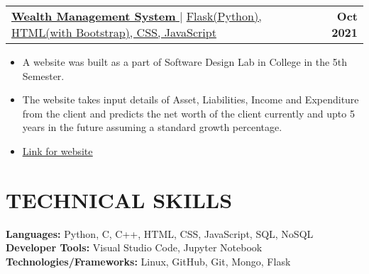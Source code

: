 \documentclass[letterpaper,11pt]{article}
\makeatletter
\newcommand{\resumeItem}[1]{
  \item\small{
    {#1 \vspace{-2pt}}
  }
}
\newcommand{\resumeSubheading}[4]{
  \vspace{-2pt}\item
    \begin{tabular*}{1.0\textwidth}[t]{l@{\extracolsep{\fill}}r}
      \textbf{\large#1} & \textbf{\small #2} \\
      \textit{\large#3} & \textit{\small #4} \\
      
    \end{tabular*}\vspace{-7pt}
}
\newcommand{\resumeProjectHeading}[2]{
    \item
    \begin{tabular*}{1.001\textwidth}{l@{\extracolsep{\fill}}r}
      \small#1 & \textbf{\small #2}\\
    \end{tabular*}\vspace{-7pt}
}
\newcommand{\resumeSubHeadingListStart}{\begin{itemize}[leftmargin=0.0in, label={}]}
\newcommand{\resumeSubHeadingListEnd}{\end{itemize}}
\newcommand{\resumeItemListStart}{\begin{itemize}}
\newcommand{\resumeItemListEnd}{\end{itemize}\vspace{-5pt}}
\makeatother
\begin{document}
      \resumeProjectHeading
          {\href{https://github.com/Sh0702/worth-it}{\textbf{\large{\underline{Wealth Management System}}} \href{Project Link}{\raisebox{-0.1\height}\faExternalLink }} $|$ \large{\underline{Flask(Python), HTML(with Bootstrap), CSS, JavaScript}}}{Oct 2021}
          \resumeItemListStart
            \resumeItem{\normalsize{A website was built as a part of Software Design Lab in College in the 5th Semester.}}
            \resumeItem{\normalsize{The website takes input details of Asset, Liabilities, Income and Expenditure from the client and predicts the net worth of the client currently and upto 5 years in the future assuming a standard growth percentage.}}
            \resumeItem{\textcolor{accent} {\href{https://worth-it2021.herokuapp.com/} {\underline{\normalsize{Link for website}}}}}
          \resumeItemListEnd
          \vspace{-13pt}
          
            
          
\vspace{-0.1pt}
%



  
\section{TECHNICAL SKILLS}
 \begin{itemize}[leftmargin=0.15in, label={}]
    \small{\item{
     \textbf{\normalsize{Languages:}}{ \normalsize{Python, C, C++, HTML, CSS, JavaScript, SQL, NoSQL}} \\
     \textbf{\normalsize{Developer Tools:}}{ \normalsize{Visual Studio Code, Jupyter Notebook}} \\
     \textbf{\normalsize{Technologies/Frameworks:}}{\normalsize{ Linux, GitHub, Git, Mongo, Flask}} \\
    }}
 \end{itemize}
 \vspace{-15pt}
\end{document}
